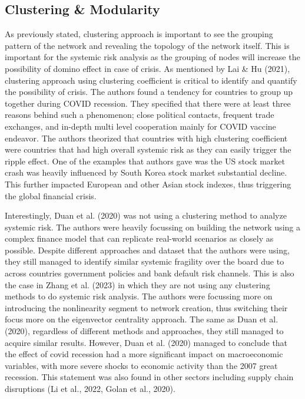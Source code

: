 \documentclass[a4paper,11pt]{article}
\begin{document}
\subsection{Clustering \& Modularity}
As previously stated, clustering approach is important to see the grouping pattern of the network and revealing the topology of the network itself. This is important for the systemic risk analysis as the grouping of nodes will increase the possibility of domino effect in case of crisis. As mentioned by Lai \& Hu (2021), clustering approach using clustering coefficient is critical to identify and quantify the possibility of crisis. The authors found a tendency for countries to group up together during COVID recession. They specified that there were at least three reasons behind such a phenomenon; close political contacts, frequent trade exchanges, and in-depth multi level cooperation mainly for COVID vaccine endeavor. The authors theorized that countries with high clustering coefficient were countries that had high overall systemic risk as they can easily trigger the ripple effect. One of the examples that authors gave was the US stock market crash was heavily influenced by South Korea stock market substantial decline. This further impacted European and other Asian stock indexes, thus triggering the global financial crisis.

Interestingly, Duan et al. (2020) was not using a clustering method to analyze systemic risk. The authors were heavily focussing on building the network using a complex finance model that can replicate real-world scenarios as closely as possible. Despite different approaches and dataset that the authors were using, they still managed to identify similar systemic fragility over the board due to across countries government policies and bank default risk channels. This is also the case in Zhang et al. (2023) in which they are not using any clustering methods to do systemic risk analysis. The authors were focussing more on introducing the nonlinearity segment to network creation, thus switching their focus more on the eigenvector centrality approach. The same as Duan et al. (2020), regardless of different methods and approaches, they still managed to acquire similar results. However, Duan et al. (2020) managed to conclude that the effect of covid recession had a more significant impact on macroeconomic variables, with more severe shocks to economic activity than the 2007 great recession. This statement was also found in other sectors including supply chain disruptions (Li et al., 2022, Golan et al., 2020).
\end{document}
